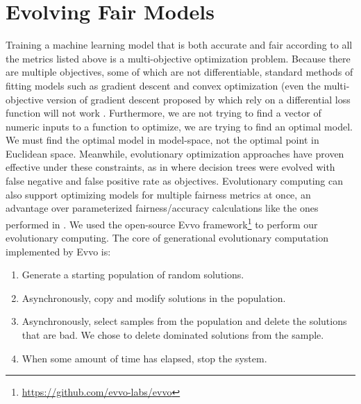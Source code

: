 \documentclass[twoside]{article}
\begin{document}
\section{Evolving Fair Models}
Training a machine learning model that is both accurate and fair according to all the metrics listed above is a multi-objective optimization problem. Because there are multiple objectives, some of which are not differentiable, standard methods of fitting models such as gradient descent and convex optimization (even the multi-objective version of gradient descent proposed by \cite{Desideri:2012} which rely on a differential loss function will not work \cite{Zerbinati:2011}. Furthermore, we are not trying to find a vector of numeric inputs to a function to optimize, we are trying to find an optimal model. We must find the optimal model in model-space, not the optimal point in Euclidean space. Meanwhile, evolutionary optimization approaches have proven effective under these constraints, as in \citep{Zhao:2007} where decision trees were evolved with false negative and false positive rate as objectives. Evolutionary computing can also support optimizing models for multiple fairness metrics at once, an advantage over parameterized fairness/accuracy calculations like the ones performed in \citep{Friedler:2019}. We used the open-source Evvo framework\footnote{\href{https://github.com/evvo-labs/evvo}{https://github.com/evvo-labs/evvo}} to perform our evolutionary computing. The core of generational evolutionary computation implemented by Evvo is:
	
\begin{enumerate}
\item Generate a starting population of random solutions.
\item Asynchronously, copy and modify solutions in the population.
\item Asynchronously, select samples from the population and delete the solutions that are bad. We chose to delete dominated solutions from the sample.
\item When some amount of time has elapsed, stop the system.
\end{enumerate}
\end{document}
